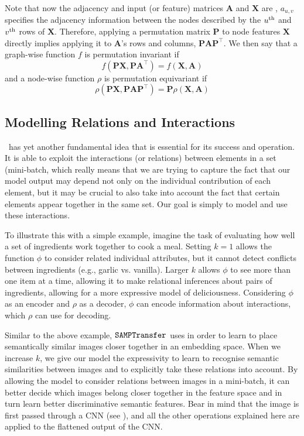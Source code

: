 Note that now the adjacency and input (or feature) matrices $\symbf{A}$ and $\symbf{X}$ are , $a_{u, v}$
specifies the adjacency information between the nodes described by the $u\textsuperscript{th}$ and $v\textsuperscript{th}$
rows of $\symbf{X}$. Therefore, applying a permutation matrix $\symbf{P}$ to node features $\symbf{X}$ directly implies applying it to $\symbf{A}$'s rows and columns, $\symbf{PA}\symbf{P}^\top$. We then say that a graph-wise function $f$ is permutation invariant if 
\begin{equation}
    f\left(\symbf{P X}, \symbf{P A}^{\top}\right)=f(\symbf{X}, \symbf{A})
\end{equation}
and a node-wise function $\rho$ is permutation equivariant if
\begin{equation}
    \rho\left(\symbf{P X}, \symbf{P A P}^{\top}\right)=\symbf{P}\rho(\symbf{X}, \symbf{A})
\end{equation}

\subsection{Modelling Relations and Interactions}\label{ssec:relation-and-interactions}

\samptr\ has yet another fundamental idea that is essential for its success and operation. 
It is able to exploit the interactions (or relations) between elements in a set (mini-batch, which really means that we are trying to capture the fact that our model output may depend not only on the individual contribution of each element, but it may be crucial to also take into account the fact that certain elements appear together in the same set. Our goal is simply to model and use these interactions.

To illustrate this with a simple example, imagine the task of evaluating how well a set of ingredients work together to cook a meal. Setting $k=1$ allows the function $\phi$ to consider related individual attributes, but it cannot detect conflicts between ingredients (e.g., garlic vs. vanilla). Larger $k$ allows $\phi$ to see more than one item at a time, allowing it to make relational inferences about pairs of ingredients, allowing for a more expressive model of deliciousness. Considering $\phi$ as an encoder and $\rho$ as a decoder, $\phi$ can encode information about interactions, which $\rho$ can use for decoding.

Similar to the above example, $\texttt{SAMPTransfer}$ uses  in order to learn to place semantically similar images closer together in an embedding space. When we increase $k$, we give our model the expressivity to learn to recognise semantic similarities between images and to explicitly take these relations into account. By allowing the model to consider relations between images in a mini-batch, it can better decide which images belong closer together in the feature space and in turn learn better discriminative semantic features. Bear in mind that the image is first passed through a CNN (see ), and all the other operations explained here are applied to the flattened output of the CNN.


